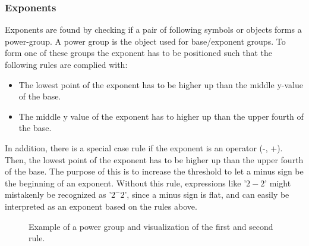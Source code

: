 \subsubsection{Exponents}
\label{interpretation-exponents}

Exponents are found by checking if a pair of following symbols or objects forms a power-group. A power group is the object used for base/exponent groups. To form one of these groups the exponent has to be positioned such that the following rules are complied with:
\begin{itemize}
    \setlength\itemsep{0em}
    \item The lowest point of the exponent has to be higher up than the middle y-value of the base.
    \item The middle y value of the exponent has to higher up than the upper fourth of the base.
\end{itemize}
In addition, there is a special case rule if the exponent is an operator (-, +). Then, the lowest point of the exponent has to be higher up than the upper fourth of the base. The purpose of this is to increase the threshold to let a minus sign be the beginning of an exponent. Without this rule, expressions like '$2-2$' might mistakenly be recognized as '$2^{-}2$', since a minus sign is flat, and can easily be interpreted as an exponent based on the rules above.

\begin{figure}[H]
\centering
{}
\caption{Example of a power group and visualization of the first and second rule.}
\end{figure}

